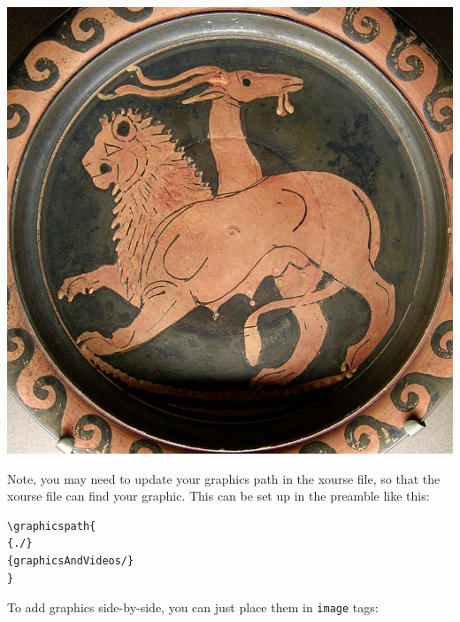 \documentclass{ximera}
\begin{document}
\begin{image}
\includegraphics{chimera.jpg}
\end{image}
Note, you may need to update your graphics path in the xourse file, so
that the xourse file can find your graphic. This can be set up in the
preamble like this:
\begin{verbatim}
\graphicspath{
{./}
{graphicsAndVideos/}
}
\end{verbatim}

To add graphics side-by-side, you can just place them in \verb|image| tags:
\end{document}

